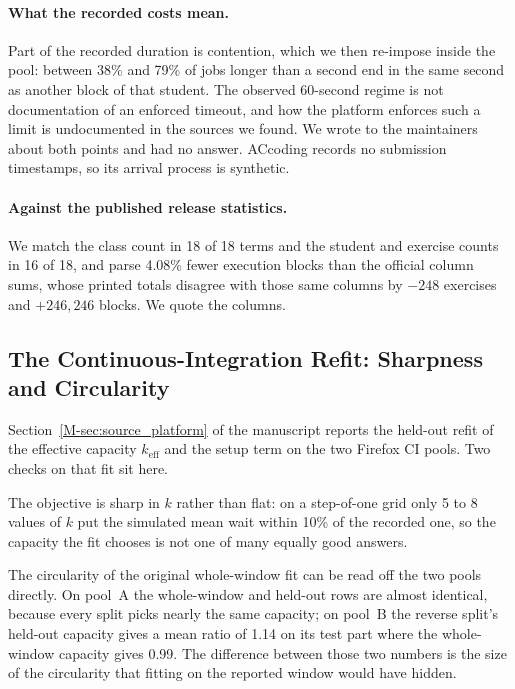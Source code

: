 \documentclass[mathematics,supfile,submit,moreauthors]{Definitions/mdpi}
\newcommand{\devnum}[1]{#1}
\begin{document}
\paragraph{What the recorded costs mean.}
Part of the recorded duration is contention, which we then re-impose inside the pool:
between \devnum{38\%} and \devnum{79\%} of jobs longer than a second end in the same
second as another block of that student. The observed \devnum{60}-second regime is not
documentation of an enforced timeout, and how the platform enforces such a limit is
undocumented in the sources we found. We wrote to the maintainers about both points and
had no answer. ACcoding \cite{accoding2024} records no submission timestamps, so its
arrival process is synthetic.

\paragraph{Against the published release statistics.}
We match the class count in \devnum{18} of \devnum{18} terms and the student and exercise
counts in \devnum{16} of \devnum{18}, and parse \devnum{4.08\%} fewer execution blocks
than the official column sums, whose printed totals disagree with those same columns by
\devnum{$-248$} exercises and \devnum{$+246{,}246$} blocks. We quote the columns.

\subsection{The Continuous-Integration Refit: Sharpness and Circularity}

Section~\ref*{M-sec:source_platform} of the manuscript reports the held-out refit of the effective capacity
$k_{\mathrm{eff}}$ and the setup term on the two Firefox CI pools. Two checks on that fit
sit here.

The objective is sharp in $k$ rather than flat: on a step-of-one grid only \devnum{5} to
\devnum{8} values of $k$ put the simulated mean wait within \devnum{10\%} of the recorded
one, so the capacity the fit chooses is not one of many equally good answers.

The circularity of the original whole-window fit can be read off the two pools directly.
On pool~A the whole-window and held-out rows are almost identical, because every split
picks nearly the same capacity; on pool~B the reverse split's held-out capacity gives a
mean ratio of \devnum{1.14} on its test part where the whole-window capacity gives
\devnum{0.99}. The difference between those two numbers is the size of the circularity
that fitting on the reported window would have hidden.
\end{document}
